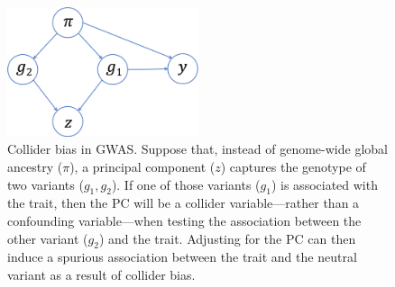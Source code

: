 \documentclass[12pt]{article}
\begin{document}
\begin{figure}
\center
\includegraphics[width=0.5\textwidth]{figs/confounding_dags/dag_collider.png}
\caption{Collider bias in GWAS. Suppose that, instead of genome-wide global ancestry ($\pi$), a principal component ($z$) captures the genotype of two variants ($g_1, g_2$). If one of those variants ($g_1$) is associated with the trait, then the PC will be a collider variable---rather than a confounding variable---when testing the association between the other variant ($g_2$) and the trait. Adjusting for the PC can then induce a spurious association between the trait and the neutral variant as a result of collider bias.}
\label{fig:collider}
\end{figure}
\end{document}
